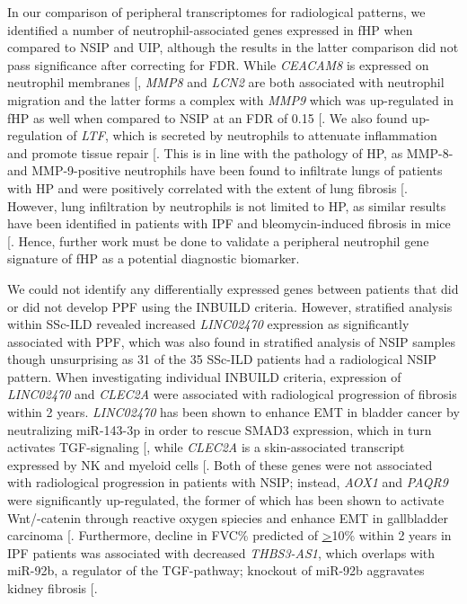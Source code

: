 \documentclass[
]{article}
\begin{document}
In our comparison of peripheral transcriptomes for radiological patterns, we identified a number of neutrophil-associated genes expressed in fHP when compared to NSIP and UIP, although the results in the latter comparison did not pass significance after correcting for FDR. While \textit{CEACAM8} is expressed on neutrophil membranes {[}\citeproc{ref-skubitz_interdependency_2008}{127}{]}, \textit{MMP8} and \textit{LCN2} are both associated with neutrophil migration and the latter forms a complex with \textit{MMP9} which was up-regulated in fHP as well when compared to NSIP at an FDR of 0.15 {[}\citeproc{ref-guardado_comprehensive_2021}{129}{]}. We also found up-regulation of \textit{LTF}, which is secreted by neutrophils to attenuate inflammation and promote tissue repair {[}\citeproc{ref-kruzel_lactoferrin_2017}{130}{]}. This is in line with the pathology of HP, as MMP-8- and MMP-9-positive neutrophils have been found to infiltrate lungs of patients with HP and were positively correlated with the extent of lung fibrosis {[}\citeproc{ref-pardo_increase_2000}{131}{]}. However, lung infiltration by neutrophils is not limited to HP, as similar results have been identified in patients with IPF and bleomycin-induced fibrosis in mice {[}\citeproc{ref-warheit-niemi_fibrotic_2022}{133}{]}. Hence, further work must be done to validate a peripheral neutrophil gene signature of fHP as a potential diagnostic biomarker.

We could not identify any differentially expressed genes between patients that did or did not develop PPF using the INBUILD criteria. However, stratified analysis within SSc-ILD revealed increased \textit{LINC02470} expression as significantly associated with PPF, which was also found in stratified analysis of NSIP samples though unsurprising as 31 of the 35 SSc-ILD patients had a radiological NSIP pattern. When investigating individual INBUILD criteria, expression of \textit{LINC02470} and \textit{CLEC2A} were associated with radiological progression of fibrosis within 2 years. \textit{LINC02470} has been shown to enhance EMT in bladder cancer by neutralizing miR-143-3p in order to rescue SMAD3 expression, which in turn activates TGF-\beta signaling {[}\citeproc{ref-huang_long_2022}{134}{]}, while \textit{CLEC2A} is a skin-associated transcript expressed by NK and myeloid cells {[}\citeproc{ref-spreu_clec2a_2007}{135}{]}. Both of these genes were not associated with radiological progression in patients with NSIP; instead, \textit{AOX1} and \textit{PAQR9} were significantly up-regulated, the former of which has been shown to activate Wnt/\beta-catenin through reactive oxygen spiecies and enhance EMT in gallbladder carcinoma {[}\citeproc{ref-yuan_aldehyde_2024}{136}{]}. Furthermore, decline in FVC\% predicted of \underline{>}10\% within 2 years in IPF patients was associated with decreased \textit{THBS3-AS1}, which overlaps with miR-92b, a regulator of the TGF-\beta pathway; knockout of miR-92b aggravates kidney fibrosis {[}\citeproc{ref-yang_mircrorna-92b_2023}{137}{]}.
\end{document}

